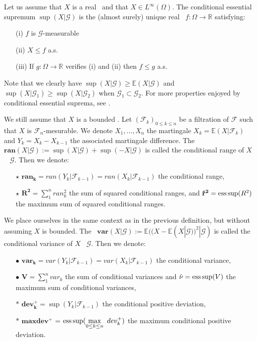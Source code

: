 \begin{notation} Let us assume that $X$ is a real \rv~and that $X \in L^{\infty}(\Omega)$. The conditional essential supremum $\sup(X|\mathcal{G})$ is the (almost surely) unique real \rv~$f:\Omega \rightarrow \mathbb{R}$ satisfying:
\begin{itemize}
\item[(i)] $f$ is $\mathcal{G}$-measurable
\item[(ii)] $X \leq f$ a.s.
\item[(iii)] If  $g:\Omega \rightarrow \mathbb{R}$ verifies (i) and (ii) then $ f\le g$ a.s.
\end{itemize}
\end{notation}
%
Note that we clearly have $\sup(X|\mathcal{G}) \geq \mathbb{E}(X|\mathcal{G}) $ and  $\sup(X|\mathcal{G}_1) \geq  \sup(X|\mathcal{G}_2) $ when  $ \mathcal{G}_1 \subset \mathcal{G}_2$.
For more properties enjoyed by conditional essential suprema, see \cite{Barron2003}.

\begin{notation}
\label{defpreli1}
We still assume that $X$ is a bounded \rv. Let $(\mathcal{F}_k)_{0\leq k \leq n}$ be a filtration of $\mathcal{F}$ such that $X$ is $\mathcal{F}_n$-mesurable. We denote $X_1,...,X_n$ the martingale $X_k=\mathbb{E}(X|\mathcal{F}_k)$ and $Y_k=X_k - X_{k-1}$ the associated martingale difference. The \rv~$\mathbf{ran}(X \vert \mathcal{G}) := \sup(X | \mathcal{G}) + \sup(-X \vert \mathcal{G}) $ is called the conditional range of $X$ \wrt~ $\mathcal{G}$. Then we denote:
\begin{itemize}
\item [$\star$] $ \mathbf{ran_k} = ran (Y_k|\mathcal{F}_{k-1}) = ran(X_k|\mathcal{F}_{k-1})$ the conditional range,
\item [$\star$] $\mathbf{R^2} = \sum_{1}^{n} ran_k^2$  the sum of squared conditional ranges, and $\mathbf{\hat{r}^2} = \supess(R^2)$ the maximum sum of squared conditional ranges.
\end{itemize}
\end{notation}

\begin{notation}
We place ourselves in the same context as in the previous definition, but without assuming $X$ is bounded. The \rv~$\mathbf{var}(X|\mathcal{G}) := \mathbb{E}((X-\mathbb{E}(X|\mathcal{G}))^2|\mathcal{G}) $ is called the conditional variance of $X$ \wrt~$\mathcal{G}$. Then we denote:
\begin{itemize}
\item [$\bullet$] $\mathbf{var_k} = var(Y_k|\mathcal{F}_{k-1})=var(X_k|\mathcal{F}_{k-1})$ the conditional variance, 
\item [$\bullet$] $\mathbf{V} = \sum_{1}^{n} var_k$ the sum of conditional variances and $\hat\nu= \supess(V)$ the maximum sum of conditional variances,
\item [$\ast$] $\mathbf{dev_k^+} = \sup(Y_k|\mathcal{F}_{k-1})$ the conditional positive deviation,
\item  [$\ast$] $\mathbf{maxdev^+} $ = $ \supess(\displaystyle\max_{0 \leq k \leq n}~ dev_k^+)$  the maximum conditional positive deviation.
\end{itemize}
\end{notation}

